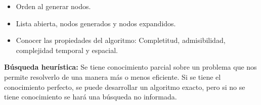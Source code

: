 \documentclass[12pt, twoside, openright]{report} %
\begin{document}
\begin{itemize}
\begin{itemize}
      \begin{itemize}
      \item Orden al generar nodos.
        
      \item Lista abierta, nodos generados y nodos expandidos.
        
      \item Conocer las propiedades del algoritmo: Completitud,
        admisibilidad, complejidad temporal y espacial.
        
      \end{itemize}
    \end{itemize}
  \end{itemize}

  \textbf{Búsqueda heurística:} Se tiene conocimiento parcial sobre un
  problema que nos permite resolverlo de una manera más o menos
  eficiente. Si se tiene el conocimiento perfecto, se puede desarrollar
  un algoritmo exacto, pero si no se tiene conocimiento se hará una
  búsqueda no informada.
\end{document}
